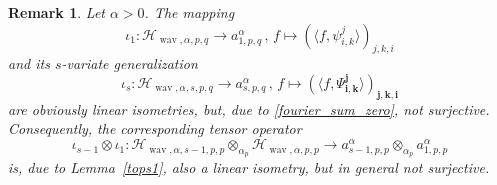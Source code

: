 \documentclass[12pt]{article}
\DeclareMathOperator{\wav}{wav}
\newtheorem{remark}{Remark}
\newcommand{\bsk}{\boldsymbol{k}}
\newcommand{\bsi}{\boldsymbol{i}}
\newcommand{\bsj}{\boldsymbol{j}}
\newcommand{\NN}{\mathbb{N}}
\newcommand{\HH}{\mathcal{H}}
\newcommand{\mig}[1]{\textcolor{blue}{#1}}
\begin{document}
\begin{remark}\label{Rem:Wav_Folgenraum}
Let $\alpha >0$.
The mapping 
$$\iota_1: \HH_{\wav,\alpha,p,q} \to a^\alpha_{1,p,q}\,,\, f\mapsto (\langle f, \psi^j_{i,k}\rangle )_{j,k,i}$$
and its $s$-variate generalization
$$\iota_s: \HH_{\wav,\alpha,s,p,q} \to a^\alpha_{s,p,q}\,,\, f\mapsto (\langle f, \Psi^{\bsj}_{\bsi,\bsk}\rangle )_{\bsj,\bsk,\bsi}$$
are obviously linear isometries, but, due to \eqref{fourier_sum_zero}, not surjective.
Consequently, the corresponding tensor operator
\[
\iota_{s-1} \otimes \iota_1: \HH_{\wav, \alpha,s-1,p,p}  \otimes_{\alpha_p}   \HH_{\wav, \alpha,p,p}
\to a^\alpha_{s-1,p,p}  \otimes_{\alpha_p} a^\alpha_{1,p,p} 
\]
is, due to Lemma~\ref{tops1}, also a linear isometry, but in general not surjective.

\end{remark}
\end{document}
